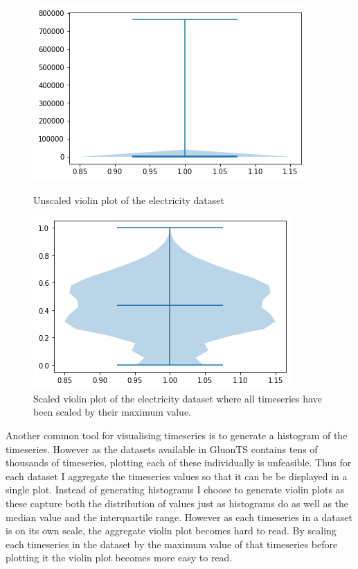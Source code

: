 \begin{figure}[htb]
  \centering
  \includegraphics[width=\linewidth]{./img//electricity_violin_unscaled.png}
  \caption{Unscaled violin plot of the electricity dataset}
  \label{fig:electricity_violin_unscaled}
  \endminipage\hfill
  \includegraphics[width=\linewidth]{./img//electricity_violin.png}
  \caption{Scaled violin plot of the electricity dataset where all timeseries have been scaled by their maximum value.}
  \label{fig:electricity_violin_scaled}
  \endminipage\hfill
\end{figure}


Another common tool for visualising timeseries is to generate a histogram of the timeseries. However as the datasets available in GluonTS contains tens of thousands of timeseries, plotting each of these individually is unfeasible. Thus for each dataset I aggregate the timeseries values so that it can be be displayed in a single plot. Instead of generating histograms I choose to generate violin plots as these capture both the distribution of values just as histograms do as well as the median value and the interquartile range. However as each timeseries in a dataset is on its own scale, the aggregate violin plot becomes hard to read. By scaling each timeseries in the dataset by the maximum value of that timeseries before plotting it the violin plot becomes more easy to read.

